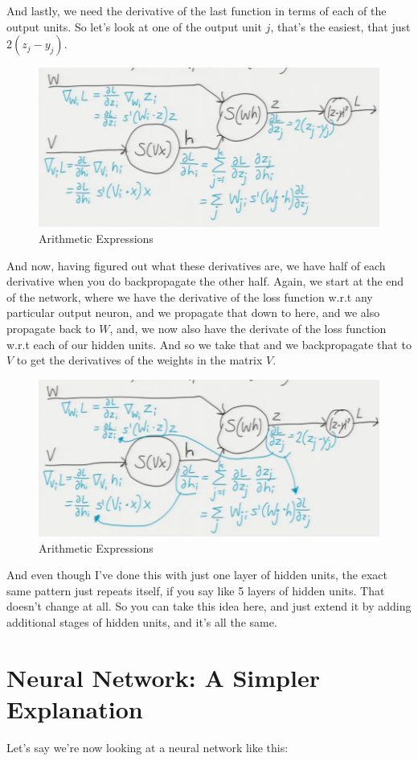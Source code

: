 \documentclass[fleqn,10pt]{olplainarticle}
\theoremstyle{definition}
\theoremstyle{remark}
\begin{document}
\clearpage
And lastly, we need the derivative of the last function in terms of each of the output units. So let's look at one of the output unit $j$, that's the easiest, that just $2(z_j - y_j)$. 
\begin{figure}[ht]
\centering
\includegraphics[width=0.7\linewidth]{images/arithmetic_expression_21}
\caption{Arithmetic Expressions}
\label{fig:arithmetic_expression_21}
\end{figure}

And now, having figured out what these derivatives are, we have half of each derivative when you do backpropagate the other half. Again, we start at the end of the network, where we have the derivative of the loss function w.r.t any particular output neuron, and we propagate that down to here, and we also propagate back to $W$, and, we now also have the derivate of the loss function w.r.t each of our hidden units. And so we take that and we backpropagate that to $V$ to get the derivatives of the weights in the matrix $V$. 
\begin{figure}[ht]
\centering
\includegraphics[width=0.7\linewidth]{images/arithmetic_expression_22}
\caption{Arithmetic Expressions}
\label{fig:arithmetic_expression_22}
\end{figure}

And even though I've done this with just one layer of hidden units, the exact same pattern just repeats itself, if you say like 5 layers of hidden units. That doesn't change at all. So you can take this idea here, and just extend it by adding additional stages of hidden units, and it's all the same.  
\clearpage

\section*{Neural Network: A Simpler Explanation}
Let's say we're now looking at a neural network like this:
\end{document}
